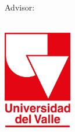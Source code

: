 
\begin{titlepage}

\begin{center}
\large

\hfill
\vfill

\begingroup
\color{Maroon}\spacedallcaps{\myTitle} \\  \bigskip %
\endgroup

\vfill
\spacedlowsmallcaps{\myName} \\ %

\vfill
Advisor:\\ \medskip 
\spacedlowsmallcaps{\myAdvisor}\\ %
\vfill

\vfill

\includegraphics[width=3cm]{gfx/logoUV} \\ \medskip %

\myDepartment \\
\myFaculty \\
\myUni \\ \bigskip

\myTime %

\vfill

\end{center}

\end{titlepage}